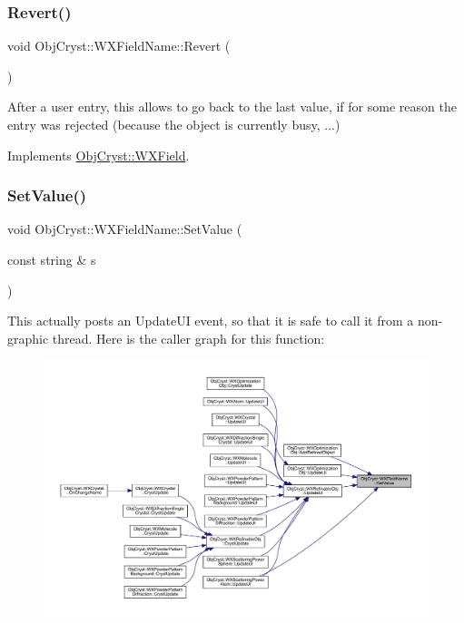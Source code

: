 \subsubsection{\texorpdfstring{Revert()}{Revert()}}
{\footnotesize\ttfamily void Obj\+Cryst\+::\+W\+X\+Field\+Name\+::\+Revert (\begin{DoxyParamCaption}{ }\end{DoxyParamCaption})\hspace{0.3cm}{\ttfamily [virtual]}}

After a user entry, this allows to go back to the last value, if for some reason the entry was rejected (because the object is currently busy, ...) 

Implements \mbox{\hyperlink{class_obj_cryst_1_1_w_x_field_a178d6d770d1e3adfa02e27da94b2dffa}{Obj\+Cryst\+::\+W\+X\+Field}}.

\mbox{\label{class_obj_cryst_1_1_w_x_field_name_a31c2d4ae66874976d03fb3dc1f61e781}} 
\subsubsection{\texorpdfstring{SetValue()}{SetValue()}}
{\footnotesize\ttfamily void Obj\+Cryst\+::\+W\+X\+Field\+Name\+::\+Set\+Value (\begin{DoxyParamCaption}\item[{const string \&}]{s }\end{DoxyParamCaption})}

This actually posts an Update\+UI event, so that it is safe to call it from a non-\/graphic thread. Here is the caller graph for this function\+:
\nopagebreak
\begin{figure}[H]
\begin{center}
\leavevmode
\includegraphics[width=350pt]{class_obj_cryst_1_1_w_x_field_name_a31c2d4ae66874976d03fb3dc1f61e781_icgraph}
\end{center}
\end{figure}
\mbox{\label{class_obj_cryst_1_1_w_x_field_name_a7a11ccb98cf448f4e964ba5bb1082d68}} 
